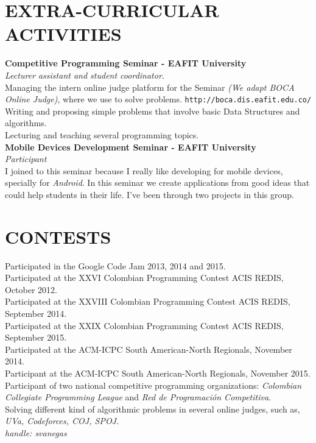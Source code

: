 \documentclass[margin, 10pt]{res} %
\begin{document}
\begin{resume}

\section{EXTRA-CURRICULAR \\ ACTIVITIES}
\textbf{Competitive Programming Seminar - EAFIT University} \\
\textit{Lecturer assistant and student coordinator.} \\
Managing the intern online judge platform for the Seminar {\sl (We adapt BOCA Online Judge)},
where we use to solve problems. \texttt{http://boca.dis.eafit.edu.co/} \\
Writing and proposing simple problems that involve basic Data Structures and algorithms. \\
Lecturing and teaching several programming topics. \\

\textbf{Mobile Devices Development Seminar - EAFIT University} \\
\textit{Participant} \\
I joined to this seminar because I really like developing for mobile devices, specially for
\emph{Android}. In this seminar we create applications from good ideas that could help
students in their life. I've been through two projects in this group.


\section{CONTESTS}
Participated in the Google Code Jam 2013, 2014 and 2015. \\
Participated at the XXVI Colombian Programming Contest ACIS REDIS, October 2012. \\ 
Participated at the XXVIII Colombian Programming Contest ACIS REDIS, September 2014. \\
Participated at the XXIX Colombian Programming Contest ACIS REDIS, September 2015. \\
Participated at the ACM-ICPC South American-North Regionals, November 2014. \\
Participant at the ACM-ICPC South American-North Regionals, November 2015. \\
Participant of two national competitive programming organizations: \emph{Colombian Collegiate
Programming League} and \emph{Red de Programación Competitiva}.\\
Solving different kind of algorithmic problems in several online judges, such as,
{\sl UVa, Codeforces, COJ, SPOJ.}\\ {\sl handle: svanegas}\\


\end{resume}
\end{document}

